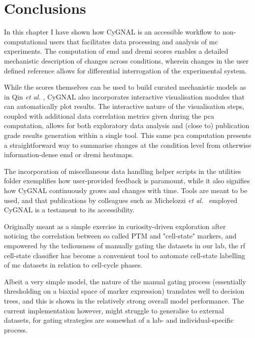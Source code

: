 \newpage
\section{Conclusions}

In this chapter I have shown how CyGNAL is an accessible workflow to non-computational users that facilitates data processing and analysis of \acrshort{mc} experiments. The computation of \acrshort{emd} and \acrshort{dremi} scores enables a detailed mechanistic description of changes across conditions, wherein changes in the user defined reference allows for differential interrogation of the experimental system. 

While the scores themselves can be used to build curated mechanistic models as in Qin \emph{et al.} \cite{qin_cell-type-specific_2020}, CyGNAL also incorporates interactive visualisation modules that can automatically plot results. The interactive nature of the visualisation steps, coupled with additional data correlation metrics given during the \acrshort{pca} computation, allows for both exploratory data analysis and (close to) publication grade results generation within a single tool. This same \acrshort{pca} computation presents a straightforward way to summarise changes at the condition level from otherwise information-dense \acrshort{emd} or \acrshort{dremi} heatmaps.

The incorporation of miscellaneous data handling helper scripts in the utilities folder exemplifies how user-provided feedback is paramount, while it also signifies how CyGNAL continuously grows and changes with time. Tools are meant to be used, and that publications by colleagues such as Michelozzi \emph{et al.}~\cite{michelozzi_activation_2023} employed CyGNAL is a testament to its accessibility.

Originally meant as a simple exercise in curiosity-driven exploration after noticing the correlation between so called PTM and "cell-state" markers, and empowered by the tediousness of manually gating the datasets in our lab, the \acrshort{rf} cell-state classifier has become a convenient tool to automate cell-state labelling of \acrshort{mc} datasets in relation to cell-cycle phases.

Albeit a very simple model, the nature of the manual gating process (essentially thresholding on a biaxial space of marker expression) translates well to decision trees, and this is shown in the relatively strong overall model performance. The current implementation however, might struggle to generalise to external datasets, for gating strategies are somewhat of a lab- and individual-specific process.

